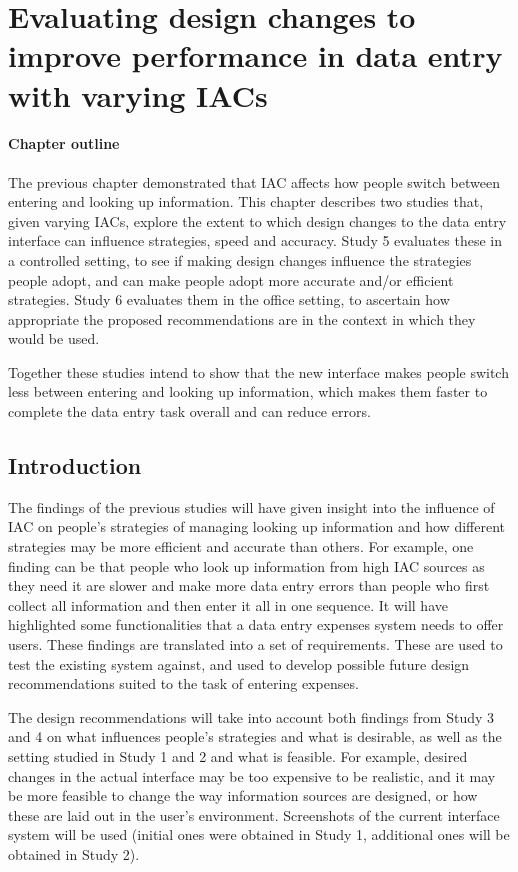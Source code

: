 \chapter{Evaluating design changes to improve performance in data entry with varying IACs}

\begin{mynote}
\subsubsection{Chapter outline}
The previous chapter demonstrated that IAC affects how people switch between entering and looking up information. This chapter describes two studies that, given varying IACs, explore the extent to which design changes to the data entry interface can influence strategies, speed and accuracy. Study 5 evaluates these in a controlled setting, to see if making design changes influence the strategies people adopt, and can make people adopt more accurate and/or efficient strategies. Study 6 evaluates them in the office setting, to ascertain how appropriate the proposed recommendations are in the context in which they would be used.

Together these studies intend to show that the new interface makes people switch less between entering and looking up information, which makes them faster to complete the data entry task overall and can reduce errors.
\end{mynote}

\section{Introduction}

The findings of the previous studies will have given insight into the influence of IAC on people's strategies of managing looking up information and how different strategies may be more efficient and accurate than others. For example, one finding can be that people who look up information from high IAC sources as they need it are slower and make more data entry errors than people who first collect all information and then enter it all in one sequence. 
It will have highlighted some functionalities that a data entry expenses system needs to offer users. These findings are translated into a set of requirements. These are used to test the existing system against, and used to develop possible future design recommendations suited to the task of entering expenses. 

The design recommendations will take into account both findings from Study 3 and 4 on what influences people's strategies and what is desirable, as well as the setting studied in Study 1 and 2 and what is feasible. For example, desired changes in the actual interface may be too expensive to be realistic, and it may be more feasible to change the way information sources are designed, or how these are laid out in the user's environment. Screenshots of the current interface system will be used (initial ones were obtained in Study 1, additional ones will be obtained in Study 2). 

